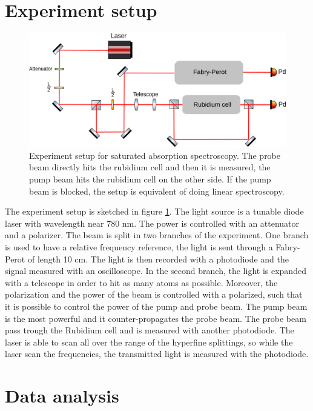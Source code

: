 \documentclass[a4paper,10pt]{article}
\begin{document}
\section{Experiment setup}
\begin{figure}[H]
\centering
\includegraphics[width=.9\textwidth]{img/setup.png}
\caption{Experiment setup for saturated absorption spectroscopy. The probe beam directly hits the rubidium cell and then it is measured, the pump beam hits the rubidium cell on the other side. If the pump beam is blocked, the setup is equivalent of doing linear spectroscopy.}\label{setup}
\end{figure}
The experiment setup is sketched in figure \ref{setup}. The light source is a tunable diode laser with wavelength near 780 nm. The power is controlled with an attenuator and a polarizer. The beam is split in two branches of the experiment. One branch is used to have a relative frequency reference, the light is sent through a Fabry-Perot of length 10 cm. The light is then recorded with a photodiode and the signal measured with an oscilloscope. In the second branch, the light is expanded with a telescope in order to hit as many atoms as possible. Moreover, the polarization and the power of the beam is controlled with a polarized, such that it is possible to control the power of the pump and probe beam. The pump beam is the most powerful and it counter-propagates the probe beam. The probe beam pass trough the Rubidium cell and is measured with another photodiode. The laser is able to scan all over the range of the hyperfine splittings, so while the laser scan the frequencies, the transmitted light is measured with the photodiode.
\section{Data analysis}
\end{document}
